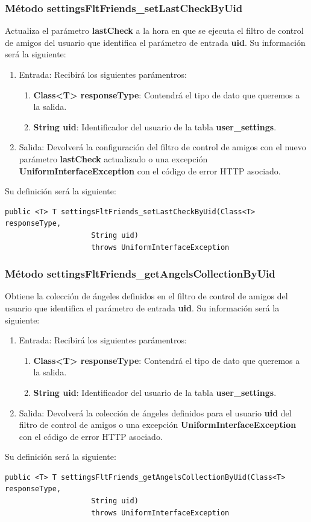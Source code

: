 \subsubsection{Método settingsFltFriends\_setLastCheckByUid}
Actualiza el parámetro \textbf{lastCheck} a la hora en que se ejecuta el filtro de control de amigos del usuario que identifica el parámetro de entrada \textbf{uid}. Su información será la siguiente:
\begin{enumerate}
\item Entrada: Recibirá los siguientes parámentros:
\begin{enumerate}
\item \textbf{Class<T> responseType}: Contendrá el tipo de dato que queremos a la salida. 
\item \textbf{String uid}: Identificador del usuario de la tabla \textbf{user\_settings}.
\end{enumerate}
\item Salida: Devolverá la configuración del filtro de control de amigos con el nuevo parámetro \textbf{lastCheck} actualizado o una excepción \textbf{UniformInterfaceException} con el código de error HTTP asociado.
\end{enumerate}
\bigskip
\par
Su definición será la siguiente:
\begin{verbatim}public <T> T settingsFltFriends_setLastCheckByUid(Class<T> responseType, 
					String uid) 
					throws UniformInterfaceException\end{verbatim}

\subsubsection{Método settingsFltFriends\_getAngelsCollectionByUid}
Obtiene la colección de ángeles definidos en el filtro de control de amigos del usuario que identifica el parámetro de entrada \textbf{uid}. Su información será la siguiente:
\begin{enumerate}
\item Entrada: Recibirá los siguientes parámentros:
\begin{enumerate}
\item \textbf{Class<T> responseType}: Contendrá el tipo de dato que queremos a la salida. 
\item \textbf{String uid}: Identificador del usuario de la tabla \textbf{user\_settings}.
\end{enumerate}
\item Salida: Devolverá la colección de ángeles definidos para el usuario \textbf{uid} del filtro de control de amigos o una excepción \textbf{UniformInterfaceException} con el código de error HTTP asociado.
\end{enumerate}
\bigskip
\par
Su definición será la siguiente:
\begin{verbatim}public <T> T settingsFltFriends_getAngelsCollectionByUid(Class<T> responseType, 
					String uid) 
					throws UniformInterfaceException \end{verbatim}





